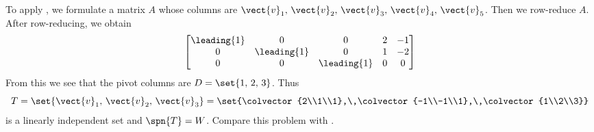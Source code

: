To apply , we formulate a matrix $A$ whose columns are $\vect{v}_1,\,\vect{v}_2,\,\vect{v}_3,\,\vect{v}_4,\,\vect{v}_5$.  Then we row-reduce $A$.  After row-reducing, we obtain
%
\begin{equation*}
\begin{bmatrix}
\leading{1} & 0 & 0 & 2 & -1\\
0 & \leading{1} & 0 & 1 & -2\\
0 & 0 & \leading{1} & 0 & 0
\end{bmatrix}
\end{equation*}
%
From this we see that the pivot columns are $D=\set{1,\,2,\,3}$.  Thus
%
\begin{equation*}
T=\set{\vect{v}_1,\,\vect{v}_2,\,\vect{v}_3}=\set{\colvector{2\\1\\1},\,\colvector{-1\\-1\\1},\,\colvector{1\\2\\3}}
\end{equation*}
%
is a linearly independent set and $\spn{T}=W$.  Compare this problem with .
